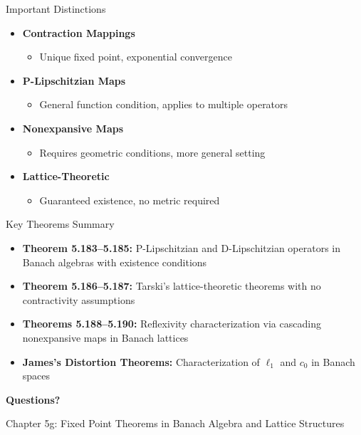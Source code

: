 \documentclass[aspectratio=169,10pt]{beamer}
\begin{document}
\begin{frame}{Important Distinctions}
  \begin{itemize}
    \item \textbf{Contraction Mappings}
      \begin{itemize}
        \item Unique fixed point, exponential convergence
      \end{itemize}

    \vspace{0.2cm}

    \item \textbf{P-Lipschitzian Maps}
      \begin{itemize}
        \item General function condition, applies to multiple operators
      \end{itemize}

    \vspace{0.2cm}

    \item \textbf{Nonexpansive Maps}
      \begin{itemize}
        \item Requires geometric conditions, more general setting
      \end{itemize}

    \vspace{0.2cm}

    \item \textbf{Lattice-Theoretic}
      \begin{itemize}
        \item Guaranteed existence, no metric required
      \end{itemize}
  \end{itemize}
\end{frame}

\begin{frame}{Key Theorems Summary}
  \begin{itemize}
    \item \textbf{Theorem 5.183--5.185:} P-Lipschitzian and D-Lipschitzian operators
      in Banach algebras with existence conditions

    \item \textbf{Theorem 5.186--5.187:} Tarski's lattice-theoretic theorems with
      no contractivity assumptions

    \item \textbf{Theorems 5.188--5.190:} Reflexivity characterization via
      cascading nonexpansive maps in Banach lattices

    \item \textbf{James's Distortion Theorems:} Characterization of $\ell_1$ and
      $c_0$ in Banach spaces
  \end{itemize}
\end{frame}

\begin{frame}
  \centering
  \vspace{1cm}

  {\Huge \textbf{Questions?}}

  \vspace{1cm}

  {\normalsize Chapter 5g: Fixed Point Theorems in Banach Algebra and Lattice Structures}
\end{frame}
\end{document}
